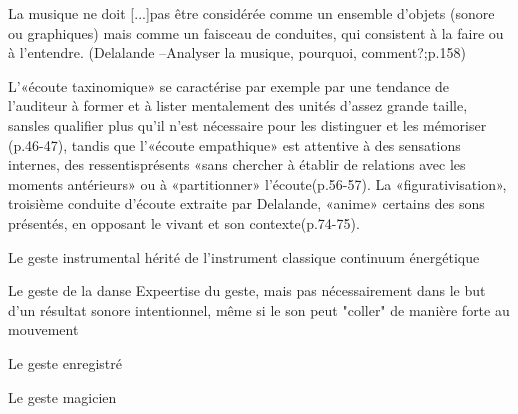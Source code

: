 La musique ne doit [...]pas être considérée comme un ensemble d’objets (sonore ou graphiques) mais comme un faisceau de conduites, qui consistent à la faire ou à l’entendre. (Delalande –Analyser la musique, pourquoi, comment?;p.158) 
 
L’«écoute taxinomique» se caractérise par exemple par une tendance de l’auditeur à former et à lister mentalement des unités d’assez grande taille, sansles qualifier plus qu’il n’est nécessaire pour les distinguer et les mémoriser (p.46-47), tandis que l’«écoute empathique» est attentive à des sensations internes, des ressentisprésents «sans chercher à  établir de relations avec les moments antérieurs» ou à «partitionner» l’écoute(p.56-57). La «figurativisation», troisième conduite d’écoute extraite par Delalande, «anime» certains des sons présentés, en opposant le vivant et son contexte(p.74-75).




Le geste instrumental hérité de l'instrument classique
	continuum énergétique


Le geste de la danse
	Expeertise du geste, mais pas nécessairement dans le but d'un résultat sonore intentionnel, même si le son peut "coller" de manière forte au mouvement


Le geste enregistré


Le geste magicien
	

